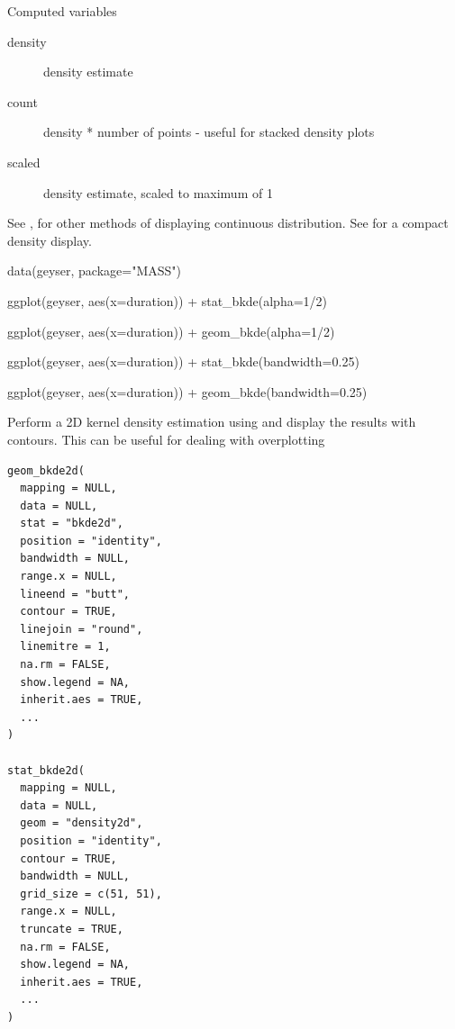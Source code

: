 \documentclass[a4paper]{book}
\begin{document}
%
\begin{Section}{Computed variables}

\begin{description}

\item[density] density estimate
\item[count] density * number of points - useful for stacked density
plots
\item[scaled] density estimate, scaled to maximum of 1

\end{description}

\end{Section}
%
\begin{SeeAlso}
See ,  for
other methods of displaying continuous distribution.
See  for a compact density display.
\end{SeeAlso}
%
\begin{Examples}
\begin{ExampleCode}
data(geyser, package="MASS")

ggplot(geyser, aes(x=duration)) +
  stat_bkde(alpha=1/2)

ggplot(geyser, aes(x=duration)) +
  geom_bkde(alpha=1/2)

ggplot(geyser, aes(x=duration)) +
 stat_bkde(bandwidth=0.25)

ggplot(geyser, aes(x=duration)) +
  geom_bkde(bandwidth=0.25)
\end{ExampleCode}
\end{Examples}
%
\begin{Description}
Perform a 2D kernel density estimation using  and display the
results with contours. This can be useful for dealing with overplotting
\end{Description}
%
\begin{Usage}
\begin{verbatim}
geom_bkde2d(
  mapping = NULL,
  data = NULL,
  stat = "bkde2d",
  position = "identity",
  bandwidth = NULL,
  range.x = NULL,
  lineend = "butt",
  contour = TRUE,
  linejoin = "round",
  linemitre = 1,
  na.rm = FALSE,
  show.legend = NA,
  inherit.aes = TRUE,
  ...
)

stat_bkde2d(
  mapping = NULL,
  data = NULL,
  geom = "density2d",
  position = "identity",
  contour = TRUE,
  bandwidth = NULL,
  grid_size = c(51, 51),
  range.x = NULL,
  truncate = TRUE,
  na.rm = FALSE,
  show.legend = NA,
  inherit.aes = TRUE,
  ...
)
\end{verbatim}
\end{Usage}
\end{document}
